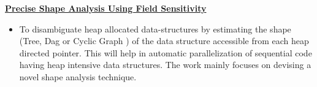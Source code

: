 \documentclass[9pt]{article}
\newenvironment{changemargin}[2]{%
  \begin{list}{}{%
    \setlength{\topsep}{0pt}%
    \setlength{\leftmargin}{#1}%
    \setlength{\rightmargin}{#2}%
    \setlength{\listparindent}{\parindent}%
    \setlength{\itemindent}{\parindent}%
    \setlength{\parsep}{\parskip}%
  }%
  \item[]}{\end{list}
}
\newenvironment{body} {
	\vspace*{-16pt}
	\begin{changemargin}{-0.25in}{-0.5in}
  }	
	{\end{changemargin}
}
\begin{document}
\begin{body}
	\vspace{14pt}
	\textbf {\href{http://www.cse.iitk.ac.in/users/karkare/MTP/2010-11/sandeep2010precise.pdf}{Precise Shape Analysis Using Field Sensitivity}} \\
		\begin{itemize} \itemsep -0pt  
		\item[] To disambiguate heap allocated data-structures by estimating the shape (Tree, Dag or Cyclic Graph ) of the data structure 
			accessible from each heap directed pointer. This will help in automatic parallelization of sequential code having heap 
			intensive data structures. The work mainly focuses on devising a novel shape analysis technique. 
		\end{itemize}
\end{body}

\smallskip
\end{document}
